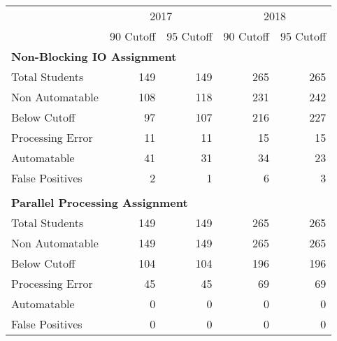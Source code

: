 \begin{tabular}{lrrrr} \toprule
& \multicolumn{2}{c}{2017} & \multicolumn{2}{c}{2018} \\
& 90 Cutoff & 95 Cutoff & 90 Cutoff & 95 Cutoff \\
\midrule
\multicolumn{5}{l}{ \textbf{Non-Blocking IO Assignment} }\\
\tspace Total Students           &   149 &   149 &   265 &   265 \\
\tspace Non Automatable          &   108 &   118 &   231 &   242 \\
\tspace \tspace Below Cutoff     &    97 &   107 &   216 &   227 \\
\tspace \tspace Processing Error &    11 &    11 &    15 &    15 \\
\tspace Automatable              &    41 &    31 &    34 &    23 \\
\tspace \tspace False Positives  &     2 &     1 &     6 &     3 \\
\\
\multicolumn{5}{l}{ \textbf{Parallel Processing Assignment} }\\
\tspace Total Students           &   149 &   149 &   265 &   265 \\
\tspace Non Automatable          &   149 &   149 &   265 &   265 \\
\tspace \tspace Below Cutoff     &   104 &   104 &   196 &   196 \\
\tspace \tspace Processing Error &    45 &    45 &    69 &    69 \\
\tspace Automatable              &     0 &     0 &     0 &     0 \\
\tspace \tspace False Positives  &     0 &     0 &     0 &     0 \\
\bottomrule
\end{tabular}
